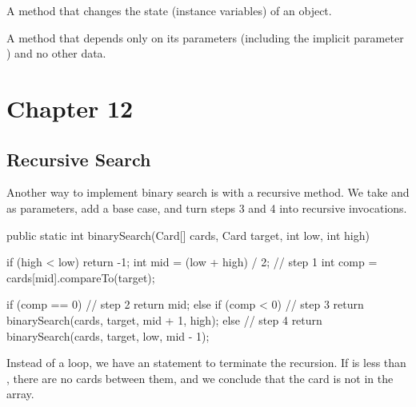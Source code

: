 \begin{description}

A method that changes the state (instance variables) of an object.

A method that depends only on its parameters (including the implicit parameter ) and no other data.

\end{description}


\section{Chapter 12}

\subsection*{Recursive Search}


Another way to implement binary search is with a recursive method.
We take  and  as parameters, add a base case, and turn steps 3 and 4 into recursive invocations.

\begin{code}
public static int binarySearch(Card[] cards, Card target,
                               int low, int high) {
    if (high < low) {
        return -1;
    }
    int mid = (low + high) / 2;                     // step 1
    int comp = cards[mid].compareTo(target);

    if (comp == 0) {                                // step 2
        return mid;
    } else if (comp < 0) {                          // step 3
        return binarySearch(cards, target, mid + 1, high);
    } else {                                        // step 4
        return binarySearch(cards, target, low, mid - 1);
    }
}
\end{code}

Instead of a  loop, we have an  statement to terminate the recursion.
If  is less than , there are no cards between them, and we conclude that the card is not in the array.


